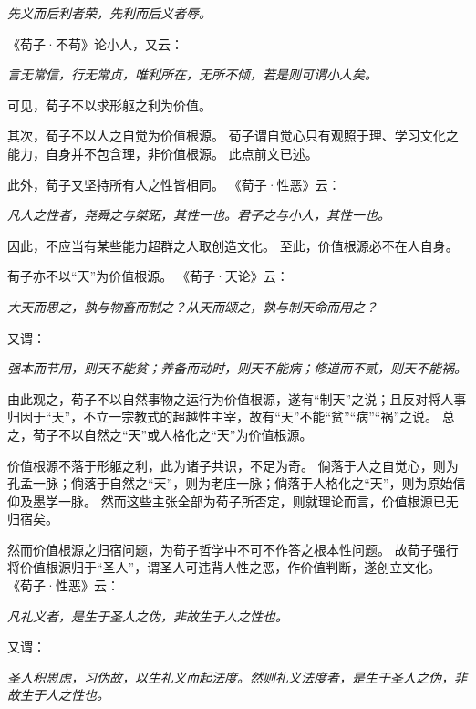 \documentclass[11pt]{article}
\begin{document}
\textit{先义而后利者荣，先利而后义者辱。}

《荀子·不苟》论小人，又云：

\textit{言无常信，行无常贞，唯利所在，无所不倾，若是则可谓小人矣。}

可见，荀子不以求形躯之利为价值。

\newline

其次，荀子不以人之自觉为价值根源。
荀子谓自觉心只有观照于理、学习文化之能力，自身并不包含理，非价值根源。
此点前文已述。

\newline

此外，荀子又坚持所有人之性皆相同。
《荀子·性恶》云：

\textit{凡人之性者，尧舜之与桀跖，其性一也。君子之与小人，其性一也。}

因此，不应当有某些能力超群之人取创造文化。
至此，价值根源必不在人自身。

\newline

荀子亦不以“天”为价值根源。
《荀子·天论》云：

\textit{大天而思之，孰与物畜而制之？从天而颂之，孰与制天命而用之？}

又谓：

\textit{强本而节用，则天不能贫；养备而动时，则天不能病；修道而不贰，则天不能祸。}

由此观之，荀子不以自然事物之运行为价值根源，遂有“制天”之说；且反对将人事归因于“天”，不立一宗教式的超越性主宰，故有“天”不能“贫”“病”“祸”之说。
总之，荀子不以自然之“天”或人格化之“天”为价值根源。

\newline

价值根源不落于形躯之利，此为诸子共识，不足为奇。
倘落于人之自觉心，则为孔孟一脉；倘落于自然之“天”，则为老庄一脉；倘落于人格化之“天”，则为原始信仰及墨学一脉。
然而这些主张全部为荀子所否定，则就理论而言，价值根源已无归宿矣。

\newline

然而价值根源之归宿问题，为荀子哲学中不可不作答之根本性问题。
故荀子强行将价值根源归于“圣人”，谓圣人可违背人性之恶，作价值判断，遂创立文化。
《荀子·性恶》云：

\textit{凡礼义者，是生于圣人之伪，非故生于人之性也。}

又谓：

\textit{圣人积思虑，习伪故，以生礼义而起法度。然则礼义法度者，是生于圣人之伪，非故生于人之性也。}
\end{document}

